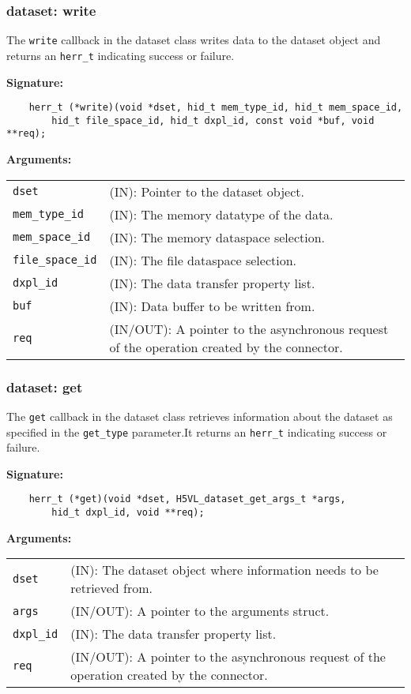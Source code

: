 \subsubsection{dataset: write}
The \texttt{write} callback in the dataset class writes data to
the dataset object and returns an \texttt{herr\_t} indicating success or
failure.\bigskip

\begin{mdframed}[style=bgbox]
\textbf{Signature:}
\begin{lstlisting}
    herr_t (*write)(void *dset, hid_t mem_type_id, hid_t mem_space_id, 
        hid_t file_space_id, hid_t dxpl_id, const void *buf, void **req);
\end{lstlisting}

\textbf{Arguments:}\\
\begin{tabular}{l p{13.5cm}}
  \texttt{dset} & (IN): Pointer to the dataset object.\\
  \texttt{mem\_type\_id} & (IN): The memory datatype of the data.\\
  \texttt{mem\_space\_id} & (IN): The memory dataspace selection.\\
  \texttt{file\_space\_id} & (IN): The file dataspace selection.\\
  \texttt{dxpl\_id} & (IN): The data transfer property list.\\
  \texttt{buf} & (IN): Data buffer to be written from.\\
  \texttt{req} & (IN/OUT): A pointer to the asynchronous request of the
  operation created by the connector.\\
\end{tabular}
\end{mdframed}

\subsubsection{dataset: get}
The \texttt{get} callback in the dataset class retrieves
information about the dataset as specified in the \texttt{get\_type}
parameter.It returns an \texttt{herr\_t} indicating success or failure.
\bigskip

\begin{mdframed}[style=bgbox]
\textbf{Signature:}
\begin{lstlisting}
    herr_t (*get)(void *dset, H5VL_dataset_get_args_t *args, 
        hid_t dxpl_id, void **req);
\end{lstlisting}

\textbf{Arguments:}\\
\begin{tabular}{l p{13.5cm}}
  \texttt{dset} & (IN): The dataset object where information needs to be
  retrieved from.\\
  \texttt{args} & (IN/OUT): A pointer to the arguments struct.\\
  \texttt{dxpl\_id} & (IN): The data transfer property list.\\
  \texttt{req} & (IN/OUT): A pointer to the asynchronous request of the
  operation created by the connector.\\
\end{tabular}
\end{mdframed}

